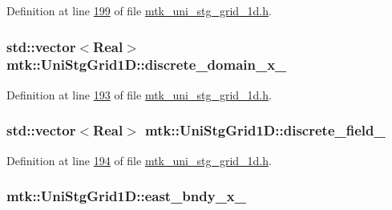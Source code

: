 Definition at line \hyperlink{mtk__uni__stg__grid__1d_8h_source_l00199}{199} of file \hyperlink{mtk__uni__stg__grid__1d_8h_source}{mtk\+\_\+uni\+\_\+stg\+\_\+grid\+\_\+1d.\+h}.

\hypertarget{classmtk_1_1UniStgGrid1D_a0a1f9c00e21659e05f414dd97e2a52e3}{
\subsubsection[{discrete\+\_\+domain\+\_\+x\+\_\+}]{\setlength{\rightskip}{0pt plus 5cm}std\+::vector$<${\bf Real}$>$ mtk\+::\+Uni\+Stg\+Grid1\+D\+::discrete\+\_\+domain\+\_\+x\+\_\+\hspace{0.3cm}{\ttfamily [private]}}}\label{classmtk_1_1UniStgGrid1D_a0a1f9c00e21659e05f414dd97e2a52e3}


Definition at line \hyperlink{mtk__uni__stg__grid__1d_8h_source_l00193}{193} of file \hyperlink{mtk__uni__stg__grid__1d_8h_source}{mtk\+\_\+uni\+\_\+stg\+\_\+grid\+\_\+1d.\+h}.

\hypertarget{classmtk_1_1UniStgGrid1D_a7379a5c6d16210cdd61ffa731bc47edc}{
\subsubsection[{discrete\+\_\+field\+\_\+}]{\setlength{\rightskip}{0pt plus 5cm}std\+::vector$<${\bf Real}$>$ mtk\+::\+Uni\+Stg\+Grid1\+D\+::discrete\+\_\+field\+\_\+\hspace{0.3cm}{\ttfamily [private]}}}\label{classmtk_1_1UniStgGrid1D_a7379a5c6d16210cdd61ffa731bc47edc}


Definition at line \hyperlink{mtk__uni__stg__grid__1d_8h_source_l00194}{194} of file \hyperlink{mtk__uni__stg__grid__1d_8h_source}{mtk\+\_\+uni\+\_\+stg\+\_\+grid\+\_\+1d.\+h}.

\hypertarget{classmtk_1_1UniStgGrid1D_a69a7d6be3171e53177e476348d04f4ae}{
\subsubsection[{east\+\_\+bndy\+\_\+x\+\_\+}]{ mtk\+::\+Uni\+Stg\+Grid1\+D\+::east\+\_\+bndy\+\_\+x\+\_\+\hspace{0.3cm}{\ttfamily [private]}}}\label{classmtk_1_1UniStgGrid1D_a69a7d6be3171e53177e476348d04f4ae}


